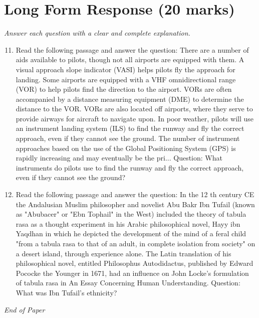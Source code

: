 \documentclass[12pt]{article}
\begin{document}
\section*{Long Form Response (20 marks)}
\textit{Answer each question with a clear and complete explanation.}
\begin{enumerate}[label=\arabic*.]
\setcounter{enumi}{10}
\item Read the following passage and answer the question: There are a number of aids available to pilots, though not all airports are equipped with them. A visual approach slope indicator (VASI) helps pilots fly the approach for landing. Some airports are equipped with a VHF omnidirectional range (VOR) to help pilots find the direction to the airport. VORs are often accompanied by a distance measuring equipment (DME) to determine the distance to the VOR. VORs are also located off airports, where they serve to provide airways for aircraft to navigate upon. In poor weather, pilots will use an instrument landing system (ILS) to find the runway and fly the correct approach, even if they cannot see the ground. The number of instrument approaches based on the use of the Global Positioning System (GPS) is rapidly increasing and may eventually be the pri... Question: What instruments do pilots use to find the runway and fly the correct approach, even if they cannot see the ground?
\item Read the following passage and answer the question: In the 12 th century CE the Andalusian Muslim philosopher and novelist Abu Bakr Ibn Tufail (known as "Abubacer" or "Ebn Tophail" in the West) included the theory of tabula rasa as a thought experiment in his Arabic philosophical novel, Hayy ibn Yaqdhan in which he depicted the development of the mind of a feral child "from a tabula rasa to that of an adult, in complete isolation from society" on a desert island, through experience alone. The Latin translation of his philosophical novel, entitled Philosophus Autodidactus, published by Edward Pococke the Younger in 1671, had an influence on John Locke's formulation of tabula rasa in An Essay Concerning Human Understanding. Question: What was Ibn Tufail's ethnicity?
\end{enumerate}

\vfill
\noindent\textit{End of Paper}
\end{document}
